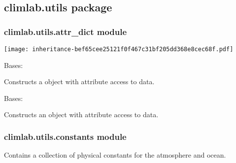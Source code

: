\documentclass[a4paper,10pt,english]{sphinxmanual}
\begin{document}
\subsection{climlab.utils package}
\label{api/climlab.utils::doc}\label{api/climlab.utils:climlab-utils-package}

\subsubsection{climlab.utils.attr\_dict module}
\label{api/climlab.utils:climlab-utils-attr-dict-module}
\texttt{[image: inheritance-bef65cee25121f0f467c31bf205dd368e8cec68f.pdf]}
\label{api/climlab.utils:module-climlab.utils.attr_dict}

\begin{fulllineitems}
\label{api/climlab.utils:climlab.utils.attr_dict.AttrDict}
Bases: \href{http://docs.python.org/2.7/library/stdtypes.html\#dict}{}

Constructs a \href{http://docs.python.org/2.7/library/stdtypes.html\#dict}{} object with attribute access to data.

\end{fulllineitems}


\begin{fulllineitems}
\label{api/climlab.utils:climlab.utils.attr_dict.OrderedAttrDict}
Bases: \href{http://docs.python.org/2.7/library/collections.html\#collections.OrderedDict}{}

Constructs an \href{http://docs.python.org/2.7/library/collections.html\#collections.OrderedDict}{} object with attribute access to data.

\end{fulllineitems}



\subsubsection{climlab.utils.constants module}
\label{api/climlab.utils:module-climlab.utils.constants}\label{api/climlab.utils:climlab-utils-constants-module}
Contains a collection of physical constants for the atmosphere and ocean.
\end{document}
